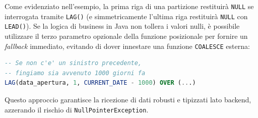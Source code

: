 \begin{observation}
Come evidenziato nell'esempio, la prima riga di una partizione restituirà \texttt{NULL} se interrogata tramite \texttt{LAG()} (e simmetricamente l'ultima riga restituirà \texttt{NULL} con \texttt{LEAD()}). Se la logica di business in Java non tollera i valori nulli, è possibile utilizzare il terzo parametro opzionale della funzione posizionale per fornire un \textit{fallback} immediato, evitando di dover innestare una funzione \texttt{COALESCE} esterna:

\begin{lstlisting}[language=SQL, basicstyle=\ttfamily\small, keywordstyle=\color{blue}\bfseries]
-- Se non c'e' un sinistro precedente, 
-- fingiamo sia avvenuto 1000 giorni fa
LAG(data_apertura, 1, CURRENT_DATE - 1000) OVER (...)
\end{lstlisting}
Questo approccio garantisce la ricezione di dati robusti e tipizzati lato backend, azzerando il rischio di \texttt{NullPointerException}.
\end{observation}